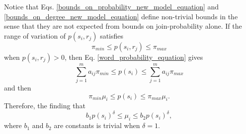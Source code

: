 \documentclass{article}
\begin{document}
Notice that Eqs. \ref{bounds_on_probability_new_model_equation} and \ref{bounds_on_degree_new_model_equation} define non-trivial bounds in the sense that they are not expected from bounds on join-probability alone. If the range of variation of $p(s_i, r_j)$ satisfies
\begin{equation*}
\pi_{min} \leq p(s_i, r_j) \leq \pi_{max}
\end{equation*}
when $p(s_i, r_j)>0$, then Eq. \ref{word_probability_equation} gives
\begin{equation*}
\sum_{j=1}^m a_{ij} \pi_{min} \leq p(s_i) \leq \sum_{j=1}^m a_{ij} \pi_{max}
\end{equation*}
and then
\begin{equation*}
\pi_{min} \mu_i \leq p(s_i) \leq \pi_{max} \mu_i. 
\end{equation*}
Therefore, the finding that 
\begin{equation*}
b_1 p(s_i)^\delta \leq \mu_i \leq b_2 p(s_i)^\delta, 
\end{equation*}
where $b_1$ and $b_2$ are constants is trivial when $\delta = 1$. 


 
\end{document}
